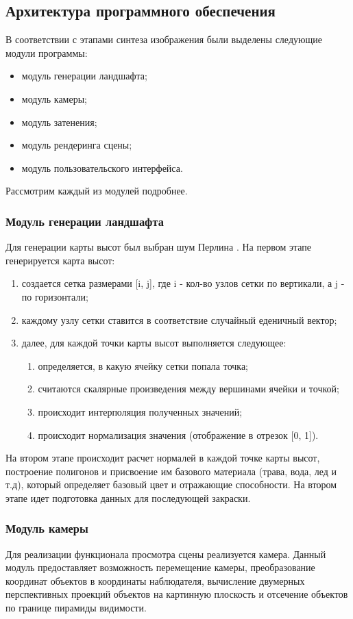 \documentclass{article}
\begin{document}
	\subsection{Архитектура программного обеспечения}
	\indent В соответствии с этапами синтеза изображения были выделены следующие модули программы:
	\begin{itemize}
		\item модуль генерации ландшафта;
		\item модуль камеры;
		\item модуль затенения;
		\item модуль рендеринга сцены;
		\item модуль пользовательского интерфейса.
	\end{itemize}
	Рассмотрим каждый из модулей подробнее.
	\subsubsection{Модуль генерации ландшафта}
	\indent Для генерации карты высот был выбран шум Перлина \cite{perlinNoizeSrc}. На первом этапе генерируется карта высот:
	\renewcommand{\labelenumii}{\arabic{enumi}.\arabic{enumii}.}
	\begin{enumerate}
		\item создается сетка размерами [i, j], где i - кол-во узлов сетки по вертикали, а j - по горизонтали;
		\item каждому узлу сетки ставится в соответствие случайный еденичный вектор;
		\item далее, для каждой точки карты высот выполняется следующее:
		\begin{enumerate}
			\item определяется, в какую ячейку сетки попала точка;
			\item считаются скалярные произведения между вершинами ячейки и точкой;
			\item происходит интерполяция полученных значений;
			\item происходит нормализация значения (отображение в отрезок [0, 1]).
		\end{enumerate}
	\end{enumerate}
	\indent \indent На втором этапе происходит расчет нормалей в каждой точке карты высот, построение полигонов и присвоение им базового материала (трава, вода, лед и т.д), который определяет базовый цвет и отражающие способности. На втором этапе идет подготовка данных для последующей закраски.
	\subsubsection{Модуль камеры}
	\indent Для реализации функционала просмотра сцены реализуется камера. Данный модуль предоставляет возможность перемещение камеры, преобразование координат объектов в координаты наблюдателя, вычисление двумерных перспективных проекций объектов на картинную плоскость и отсечение объектов по границе пирамиды видимости.
\end{document}
